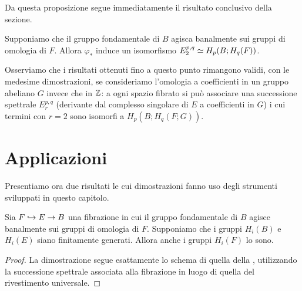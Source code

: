 Da questa proposizione segue immediatamente il risultato conclusivo della sezione.
\begin{theorem}
Supponiamo che il gruppo fondamentale di \(B\) agisca banalmente sui gruppi di omologia di \(F\). Allora \(\varphi_*\) induce un isomorfismo \(E^{p,q}_2\simeq H_p(B;H_q(F))\).
\end{theorem}

Osserviamo che i risultati ottenuti fino a questo punto rimangono validi, con le medesime dimostrazioni, se consideriamo l'omologia a coefficienti in un gruppo abeliano \(G\) invece che in \(\mathbb{Z}\): a ogni spazio fibrato si può associare una successione spettrale \(E^{p,q}_r\) (derivante dal complesso singolare di \(E\) a coefficienti in \(G\)) i cui termini con \(r=2\) sono isomorfi a \(H_p(B;H_q(F;G))\).

\section{Applicazioni}
Presentiamo ora due risultati le cui dimostrazioni fanno uso degli strumenti sviluppati in questo capitolo.

\begin{proposition}
Sia \(F\hookrightarrow E\to B\) una fibrazione in cui il gruppo fondamentale di \(B\) agisce banalmente sui gruppi di omologia di \(F\). Supponiamo che i gruppi \(H_i(B)\) e \(H_i(E)\) siano finitamente generati. Allora anche i gruppi \(H_i(F)\) lo sono.
\end{proposition}
\begin{proof}
La dimostrazione segue esattamente lo schema di quella della , utilizzando la successione spettrale associata alla fibrazione in luogo di quella del rivestimento universale.
\end{proof}

